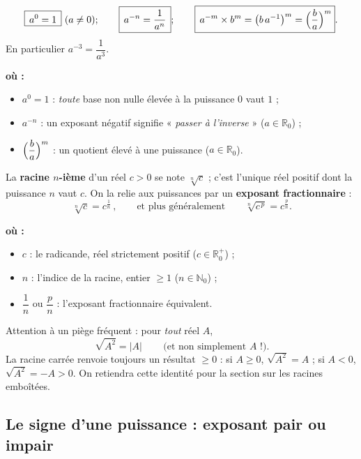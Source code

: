 \documentclass[11pt,a4paper]{article}
\newenvironment{ou}{%
  \par\smallskip\noindent\textbf{où :}\nopagebreak
  \begin{itemize}[leftmargin=1.8em,topsep=2pt,itemsep=1.5pt,parsep=0pt]}%
  {\end{itemize}}
\newcommand{\R}{\mathbb{R}}
\newcommand{\N}{\mathbb{N}}
\begin{document}
\begin{formule}
\[ \boxed{\,a^{0}=1\,}\ (a\neq 0);\qquad
   \boxed{\,a^{-n}=\dfrac{1}{a^{n}}\,};\qquad
   \boxed{\,a^{-m}\times b^{m}=\bigl(b\,a^{-1}\bigr)^{m}=\Bigl(\dfrac{b}{a}\Bigr)^{m}}. \]
En particulier $a^{-3}=\dfrac{1}{a^{3}}$.
\begin{ou}
  \item $a^{0}=1$ : \emph{toute} base non nulle élevée à la puissance $0$ vaut $1$ ;
  \item $a^{-n}$ : un exposant négatif signifie « \emph{passer à l'inverse} » ($a\in\R_0$) ;
  \item $\Bigl(\dfrac{b}{a}\Bigr)^{m}$ : un quotient élevé à une puissance ($a\in\R_0$).
\end{ou}
\end{formule}

\begin{definition}
La \textbf{racine $n$-ième} d'un réel $c>0$ se note $\sqrt[n]{c}$ ; c'est l'unique réel positif dont la
puissance $n$ vaut $c$. On la relie aux puissances par un \textbf{exposant fractionnaire} :
\[ \boxed{\,\sqrt[n]{c}=c^{\frac{1}{n}}\,},\qquad\text{et plus généralement}\qquad
   \sqrt[n]{c^{\,p}}=c^{\frac{p}{n}}. \]
\begin{ou}
  \item $c$ : le radicande, réel strictement positif ($c\in\R_0^{+}$) ;
  \item $n$ : l'indice de la racine, entier $\geq 1$ ($n\in\N_0$) ;
  \item $\dfrac{1}{n}$ ou $\dfrac{p}{n}$ : l'exposant fractionnaire équivalent.
\end{ou}
\end{definition}

\begin{theoreme}
Attention à un piège fréquent : pour \emph{tout} réel $A$,
\[ \boxed{\,\sqrt{A^{2}}=|A|\,}\qquad\text{(et non simplement } A\text{ !).} \]
La racine carrée renvoie toujours un résultat $\geq 0$ : si $A\geq 0$, $\sqrt{A^2}=A$ ; si $A<0$,
$\sqrt{A^2}=-A>0$. On retiendra cette identité pour la section sur les racines emboîtées.
\end{theoreme}

\subsection{Le signe d'une puissance : exposant pair ou impair}
\end{document}
